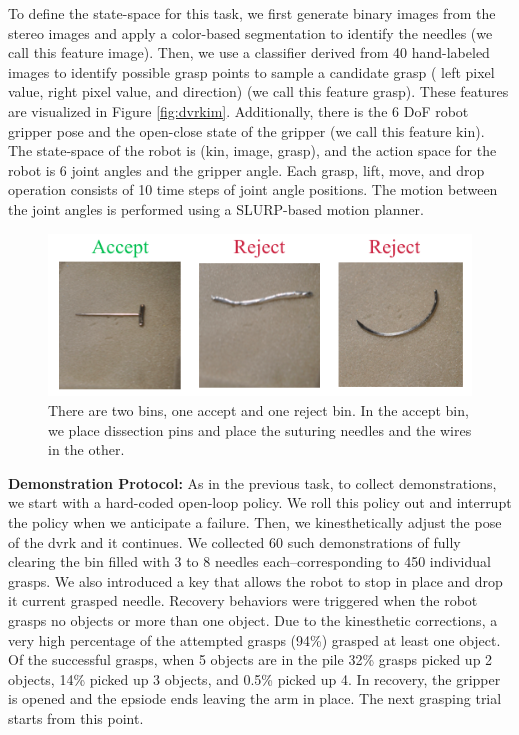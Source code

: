 To define the state-space for this task, we first generate binary images from the stereo images and apply a color-based segmentation to identify the needles (we call this feature \textsf{image}).
Then, we use a classifier derived from 40 hand-labeled images to identify possible grasp points to sample a candidate grasp ( left pixel value, right pixel value, and direction) (we call this feature \textsf{grasp}). 
These features are visualized in Figure \ref{fig:dvrkim}.
Additionally, there is the 6 DoF robot gripper pose and the open-close state of the gripper (we call this feature \textsf{kin}).
The state-space of the robot is (\textsf{kin}, \textsf{image}, \textsf{grasp}), and the action space for the robot is 6 joint angles and the gripper angle.
Each grasp, lift, move, and drop operation consists of 10 time steps of joint angle positions. The motion between the joint angles is performed using a SLURP-based motion planner.

\begin{figure}[ht!]
    \centering
    \includegraphics[width=\textwidth]{ddco-experiments/bin-picking-cats.png}
    \caption{There are two bins, one accept and one reject bin. In the accept bin, we place dissection pins and place the suturing needles and the wires in the other. \label{fig:dvrkcats}}
\end{figure}

\vspace{0.5em} \noindent \textbf{Demonstration Protocol: } As in the previous task, to collect demonstrations, we start with a hard-coded open-loop policy.
We roll this policy out and interrupt the policy when we anticipate a failure.
Then, we kinesthetically adjust the pose of the dvrk and it continues.
We collected 60 such demonstrations of fully clearing the bin filled with 3 to 8 needles each--corresponding to 450 individual grasps.
We also introduced a key that allows the robot to stop in place and drop it current grasped needle.
Recovery behaviors were triggered when the robot grasps no objects or more than one object.
Due to the kinesthetic corrections, a very high percentage of the attempted grasps (94\%) grasped at least one object. 
Of the successful grasps, when 5 objects are in the pile 32\% grasps picked up 2 objects, 14\% picked up 3 objects, and 0.5\% picked up 4.
In recovery, the gripper is opened and the epsiode ends leaving the arm in place.
The next grasping trial starts from this point.


